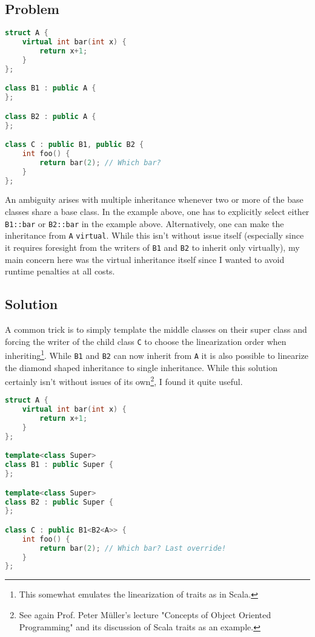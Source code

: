 \subsection{Problem}
\begin{minipage}{\linewidth}
\begin{lstlisting}[language=C++]
struct A {
    virtual int bar(int x) {
    	return x+1;
    }
};

class B1 : public A {
};

class B2 : public A {
};

class C : public B1, public B2 {
	int foo() {
		return bar(2); // Which bar?
    }
};
\end{lstlisting}
\end{minipage}
An ambiguity arises with multiple inheritance whenever two or more of the base classes share a base class. In the example above, one has to explicitly select either \texttt{B1::bar} or \texttt{B2::bar} in the example above. Alternatively, one can  make the inheritance from \texttt{A} \texttt{virtual}. While this isn't without issue itself (especially since it requires foresight from the writers of \texttt{B1} and \texttt{B2} to inherit only virtually), my main concern here was the virtual inheritance itself since I wanted to avoid runtime penalties at all costs.

\subsection{Solution}
A common trick is to simply template the middle classes on their super class and forcing the writer of the child class \texttt{C} to choose the linearization order when inheriting\footnote{This somewhat emulates the linearization of traits as in Scala.}. While \texttt{B1} and \texttt{B2} can now inherit from \texttt{A} it is also possible to linearize the diamond shaped inheritance to single inheritance. While this solution certainly isn't without issues of its own\footnote{See again Prof. Peter M\"uller's lecture "Concepts of Object Oriented Programming" and its discussion of Scala traits as an example.}, I found it quite useful.

\begin{minipage}{\linewidth}
\begin{lstlisting}[language=C++]
struct A {
    virtual int bar(int x) {
    	return x+1;
    }
};

template<class Super>
class B1 : public Super {
};

template<class Super>
class B2 : public Super {
};

class C : public B1<B2<A>> {
	int foo() {
		return bar(2); // Which bar? Last override!
    }
};
\end{lstlisting}
\end{minipage}

